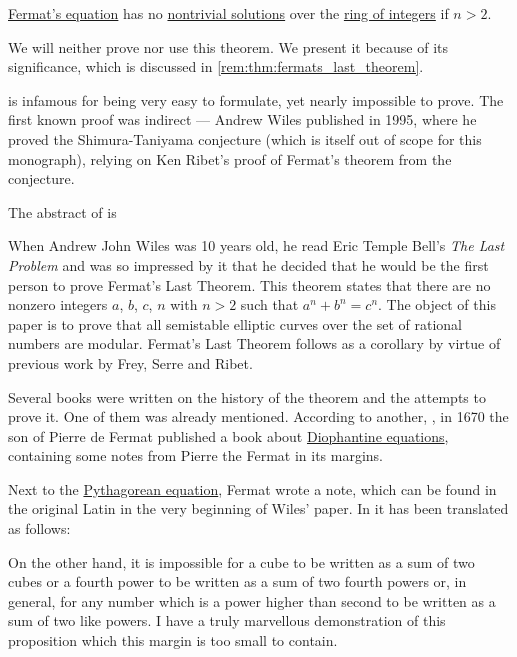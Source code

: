 \begin{theorem}\label{thm:fermats_last_theorem}
  \hyperref[def:fermats_equation]{Fermat's equation} has no \hyperref[def:polynomial_equation]{nontrivial solutions} over the \hyperref[def:integers]{ring of integers} if \( n > 2 \).
\end{theorem}
\begin{comments}
  \item We will neither prove nor use this theorem. We present it because of its significance, which is discussed in \cref{rem:thm:fermats_last_theorem}.
\end{comments}

\begin{remark}\label{rem:thm:fermats_last_theorem}
   is infamous for being very easy to formulate, yet nearly impossible to prove. The first known proof was indirect --- Andrew Wiles published \cite{Wiles1995FermatsTheorem} in 1995, where he proved the Shimura-Taniyama conjecture (which is itself out of scope for this monograph), relying on Ken Ribet's proof of Fermat's theorem from the conjecture.

  The abstract of \cite{Wiles1995FermatsTheorem} is
  \begin{displayquote}
    When Andrew John Wiles was 10 years old, he read Eric Temple Bell's \textit{The Last Problem} and was so impressed by it that he decided that he would be the first person to prove Fermat's Last Theorem. This theorem states that there are no nonzero integers \( a \), \( b \), \( c \), \( n \) with \( n > 2 \) such that \( a^n + b^n = c^n \). The object of this paper is to prove that all semistable elliptic curves over the set of rational numbers are modular. Fermat's Last Theorem follows as a corollary by virtue of previous work by Frey, Serre and Ribet.
  \end{displayquote}

  Several books were written on the history of the theorem and the attempts to prove it. One of them was already mentioned. According to another, \textcite[8]{Хинчин1934ВеликаяТеоремаФерма}, in 1670 the son of Pierre de Fermat published a book about \hyperref[def:polynomial_equation/diophantine]{Diophantine equations}, containing some notes from Pierre the Fermat in its margins.

  Next to the \hyperref[def:fermats_equation]{Pythagorean equation}, Fermat wrote a note, which can be found in the original Latin in the very beginning of Wiles' paper. In \cite[210]{Stillwell2010MathHistory} it has been translated as follows:
  \begin{displayquote}
    On the other hand, it is impossible for a cube to be written as a sum of two cubes or a fourth power to be written as a sum of two fourth powers or, in general, for any number which is a power higher than second to be written as a sum of two like powers. I have a truly marvellous demonstration of this proposition which this margin is too small to contain.
  \end{displayquote}


\end{remark}
